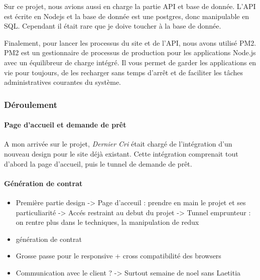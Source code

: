 \documentclass[12pt,a4paper]{article}
\begin{document}
  \bigskip

  Sur ce projet, nous avions aussi en charge la partie API et base de
  donnée. L'API est écrite en Nodejs et la base de donnée est une
  postgres, donc manipulable en SQL. Cependant il était rare que je doive
  toucher à la base de donnée.

  \bigskip

  Finalement, pour lancer les processus du site et de l'API, nous avons
  utilisé PM2. PM2 est un gestionnaire de processus de production pour les
  applications Node.js avec un équilibreur de charge intégré. Il vous
  permet de garder les applications en vie pour toujours, de les recharger
  sans temps d'arrêt et de faciliter les tâches administratives courantes
  du système.

  \bigskip

  \subsubsection{Déroulement}\label{duxe9roulement-1}

  \paragraph{Page d'accueil et demande de
  prêt}\label{page-daccueil-et-demande-de-pruxeat}

  \bigskip

  A mon arrivée sur le projet, \emph{Dernier Cri} était chargé de
  l'intégration d'un nouveau design pour le site déjà existant. Cette
  intégration comprenait tout d'abord la page d'accueil, puis le tunnel de
  demande de prêt.

  \bigskip

  \bigskip

  \paragraph{Génération de contrat}\label{guxe9nuxe9ration-de-contrat}

  \bigskip

  \bigskip

  \begin{itemize}
  \item
    Première partie design -\textgreater{} Page d'acceuil : prendre en
    main le projet et ses particuliarité -\textgreater{} Accés restraint
    au debut du projet -\textgreater{} Tunnel emprunteur : on rentre plus
    dans le techniques, la manipulation de redux
  \item
    génération de contrat
  \item
    Grosse passe pour le responsive + cross compatibilité des browsers
  \item
    Communication avec le client ? -\textgreater{} Surtout semaine de noel
    sans Laetitia
  \end{itemize}
\end{document}

